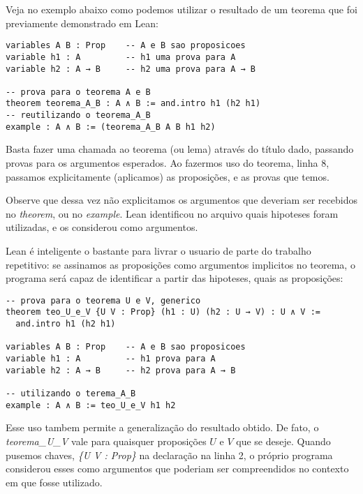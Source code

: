 Veja no exemplo abaixo como podemos utilizar o resultado de um teorema que foi previamente demonstrado em Lean:

\vspace{5mm}
\begin{lstlisting}
variables A B : Prop    -- A e B sao proposicoes
variable h1 : A         -- h1 uma prova para A
variable h2 : A → B     -- h2 uma prova para A → B

-- prova para o teorema A e B
theorem teorema_A_B : A ∧ B := and.intro h1 (h2 h1)
-- reutilizando o teorema_A_B
example : A ∧ B := (teorema_A_B A B h1 h2)
\end{lstlisting}
\vspace{5mm}

\noindent Basta fazer uma chamada ao teorema (ou lema) através do título dado, passando provas para os argumentos esperados. Ao fazermos uso do teorema, linha 8, passamos explicitamente (aplicamos) as proposições, e as provas que temos.

Observe que dessa vez não explicitamos os argumentos que deveriam ser recebidos no \textit{theorem}, ou no \textit{example}. Lean identificou no arquivo quais hipoteses foram utilizadas, e os considerou como argumentos.

Lean é inteligente o bastante para livrar o usuario de parte do trabalho repetitivo: se assinamos as proposições como argumentos implicitos no teorema, o programa será capaz de identificar a partir das hipoteses, quais as proposições:

\vspace{5mm}
\begin{lstlisting}
-- prova para o teorema U e V, generico
theorem teo_U_e_V {U V : Prop} (h1 : U) (h2 : U → V) : U ∧ V :=
  and.intro h1 (h2 h1)

variables A B : Prop    -- A e B sao proposicoes
variable h1 : A         -- h1 prova para A
variable h2 : A → B     -- h2 prova para A → B

-- utilizando o terema_A_B
example : A ∧ B := teo_U_e_V h1 h2
\end{lstlisting}
\vspace{5mm}

\noindent Esse uso tambem permite a generalização do resultado obtido. De fato, o \textit{teorema\_U\_V} vale para quaisquer proposições $U$ e $V$ que se deseje. Quando pusemos chaves, \textit{\{U V : Prop\}} na declaração na linha 2, o próprio programa considerou esses como argumentos que poderiam ser compreendidos no contexto em que fosse utilizado.

